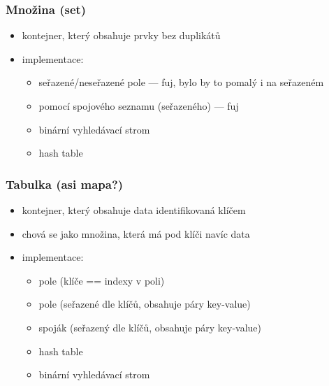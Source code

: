 \subsubsection*{Množina (set)}
\begin{itemize}
	\item kontejner, který obsahuje prvky bez duplikátů
	\item implementace:
	\begin{itemize}
		\item seřazené/neseřazené pole --- fuj, bylo by to pomalý i na seřazeném
		\item pomocí spojového seznamu (seřazeného) --- fuj
		\item binární vyhledávací strom
		\item hash table
	\end{itemize}
\end{itemize}

\subsubsection*{Tabulka (asi mapa?)}
\begin{itemize}
	\item kontejner, který obsahuje data identifikovaná klíčem
	\item chová se jako množina, která má pod klíči navíc data
	\item implementace:
	\begin{itemize}
		\item pole (klíče == indexy v poli)
		\item pole (seřazené dle klíčů, obsahuje páry key-value)
		\item spoják (seřazený dle klíčů, obsahuje páry key-value)
		\item hash table
		\item binární vyhledávací strom
	\end{itemize}
\end{itemize}